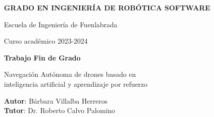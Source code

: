\thispagestyle{empty}
\vspace{2cm}

\begin{figure}[htb]
  \centerline{}
\end{figure}

\begin{center}
  {\Large {\bf GRADO EN INGENIERÍA DE ROBÓTICA SOFTWARE}}
  \vspace{5mm}
 
  {\large {Escuela de Ingeniería de Fuenlabrada}}
  \vspace{5mm}

  {\large {Curso académico 2023-2024}}

  \vspace{1cm}

  {\large {\bf Trabajo Fin de Grado}}

  \vspace{2cm}

  {\Large {Navegación Autónoma de drones basado en\\
          inteligencia artificial y aprendizaje por refuerzo\\[1cm] }}

  \vspace{5cm}
  {\bf Autor}: Bárbara Villalba Herreros \\
  {\bf Tutor}: Dr. Roberto Calvo Palomino 

\end{center}

\clearpage
\thispagestyle{empty}
